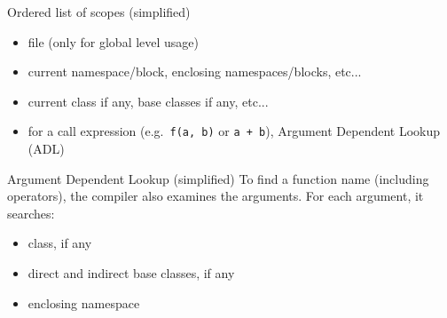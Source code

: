 \begin{frame}
  \begin{block}{Ordered list of scopes (simplified)}
    \begin{itemize}
    \item file (only for global level usage)
    \item current namespace/block, enclosing namespaces/blocks, etc...
    \item current class if any, base classes if any, etc...
    \item for a call expression (e.g.\ \texttt{f(a, b)} or \texttt{a + b}), Argument Dependent Lookup (ADL)
    \end{itemize}
  \end{block}
  \begin{exampleblock}{Argument Dependent Lookup (simplified)}
    To find a function name (including operators), the compiler also examines the arguments. For each argument, it searches:
    \begin{itemize}
    \item class, if any
    \item direct and indirect base classes, if any
    \item enclosing namespace
    \end{itemize}
  \end{exampleblock}
\end{frame}

